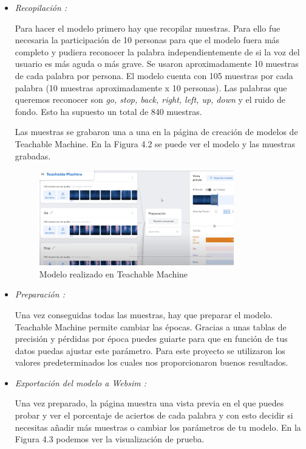 \begin{itemize}
\item \textit{Recopilación :}

Para hacer el modelo primero hay que recopilar muestras. Para ello fue necesaria la participación de 10 personas para que el modelo fuera más completo y pudiera reconocer la palabra independientemente de si la voz del usuario es más aguda o más grave.  Se usaron aproximadamente 10 muestras de cada palabra por persona. El modelo cuenta con 105 muestras por cada palabra (10 muestras aproximadamente x 10 personas). Las palabras que queremos reconocer son \textit{go, stop, back, right, left, up, down } y el ruido de fondo. Esto ha supuesto un total de 840 muestras.

Las muestras se grabaron una a una en la página de creación de modelos de Teachable Machine. En la Figura 4.2 se puede ver el modelo y las muestras grabadas.


\begin{figure}[H]
 \centering
    \includegraphics[width=0.8\textwidth, height=0.4\textwidth]{chapters/images/teachablemachine.png}
    \caption{Modelo realizado en Teachable Machine}
\end{figure}
 

\item  \textit{Preparación :}

Una vez conseguidas todas las muestras, hay que preparar el modelo. Teachable Machine permite cambiar las épocas. Gracias a unas tablas de precisión y pérdidas por época puedes guiarte para que en función de tus datos puedas ajustar este parámetro. Para este proyecto se utilizaron los valores predeterminados los cuales nos proporcionaron buenos resultados.

\item  \textit{Exportación del modelo a Websim :}

Una vez preparado, la página muestra una vista previa en el que puedes probar y ver el porcentaje de aciertos de cada palabra y con esto decidir si necesitas añadir más muestras o cambiar los parámetros de tu modelo.  En la Figura 4.3 podemos ver la visualización de prueba.


\end{itemize}
